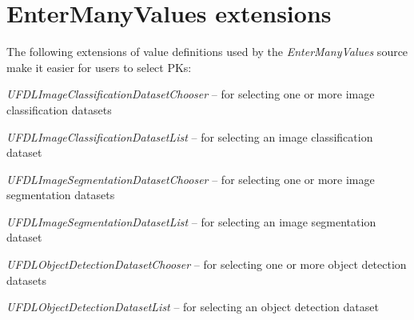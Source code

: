 \documentclass[a4paper]{book}
\begin{document}
\section{EnterManyValues extensions}
The following extensions of value definitions used by the \textit{EnterManyValues}
source make it easier for users to select PKs:
\begin{tight_itemize}
  \item \textit{UFDLImageClassificationDatasetChooser} -- for selecting one or more image classification datasets
  \item \textit{UFDLImageClassificationDatasetList} -- for selecting an image classification dataset
  \item \textit{UFDLImageSegmentationDatasetChooser} -- for selecting one or more image segmentation datasets
  \item \textit{UFDLImageSegmentationDatasetList} -- for selecting an image segmentation dataset
  \item \textit{UFDLObjectDetectionDatasetChooser} -- for selecting one or more object detection datasets
  \item \textit{UFDLObjectDetectionDatasetList} -- for selecting an object detection dataset
\end{tight_itemize}


\end{document}
